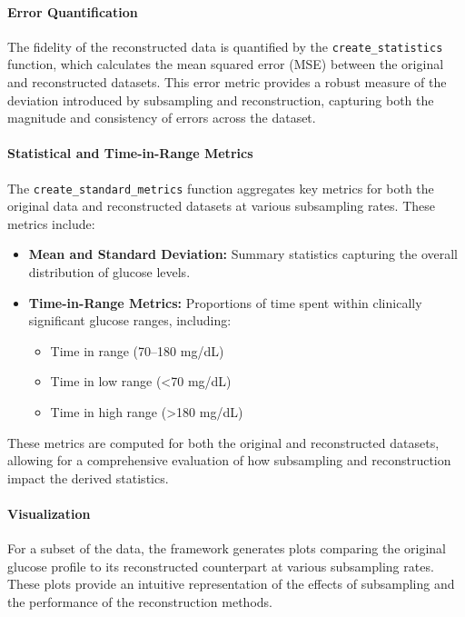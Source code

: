 \paragraph{Error Quantification}
The fidelity of the reconstructed data is quantified by the \texttt{create\_statistics} function, which calculates the mean squared error (MSE) between the original and reconstructed datasets. This error metric provides a robust measure of the deviation introduced by subsampling and reconstruction, capturing both the magnitude and consistency of errors across the dataset.

\paragraph{Statistical and Time-in-Range Metrics}
The \texttt{create\_standard\_metrics} function aggregates key metrics for both the original data and reconstructed datasets at various subsampling rates. These metrics include:
\begin{itemize}
	\item \textbf{Mean and Standard Deviation:} Summary statistics capturing the overall distribution of glucose levels.
	\item \textbf{Time-in-Range Metrics:} Proportions of time spent within clinically significant glucose ranges, including:
	\begin{itemize}
		\item Time in range (70–180 mg/dL)
		\item Time in low range (<70 mg/dL)
		\item Time in high range (>180 mg/dL)
	\end{itemize}
\end{itemize}
These metrics are computed for both the original and reconstructed datasets, allowing for a comprehensive evaluation of how subsampling and reconstruction impact the derived statistics.

\paragraph{Visualization}
For a subset of the data, the framework generates plots comparing the original glucose profile to its reconstructed counterpart at various subsampling rates. These plots provide an intuitive representation of the effects of subsampling and the performance of the reconstruction methods.


